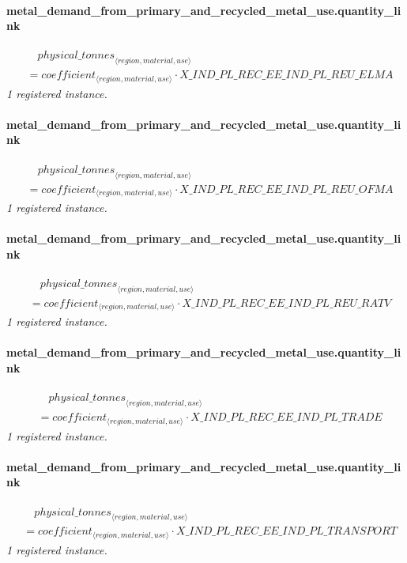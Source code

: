 \documentclass[11pt]{article}
\begin{document}
\paragraph{metal\_demand\_from\_primary\_and\_recycled\_metal\_use.quantity\_link}
\begin{align*}
&\quad {physical\_tonnes}_{\langle region, material, use\rangle}\\
&= coefficient_{\langle region, material, use\rangle} \cdot X\_IND\_PL\_REC\_EE\_IND\_PL\_REU\_ELMA
\end{align*}
\noindent\emph{1 registered instance.}\par
\paragraph{metal\_demand\_from\_primary\_and\_recycled\_metal\_use.quantity\_link}
\begin{align*}
&\quad {physical\_tonnes}_{\langle region, material, use\rangle}\\
&= coefficient_{\langle region, material, use\rangle} \cdot X\_IND\_PL\_REC\_EE\_IND\_PL\_REU\_OFMA
\end{align*}
\noindent\emph{1 registered instance.}\par
\paragraph{metal\_demand\_from\_primary\_and\_recycled\_metal\_use.quantity\_link}
\begin{align*}
&\quad {physical\_tonnes}_{\langle region, material, use\rangle}\\
&= coefficient_{\langle region, material, use\rangle} \cdot X\_IND\_PL\_REC\_EE\_IND\_PL\_REU\_RATV
\end{align*}
\noindent\emph{1 registered instance.}\par
\paragraph{metal\_demand\_from\_primary\_and\_recycled\_metal\_use.quantity\_link}
\begin{align*}
&\quad {physical\_tonnes}_{\langle region, material, use\rangle}\\
&= coefficient_{\langle region, material, use\rangle} \cdot X\_IND\_PL\_REC\_EE\_IND\_PL\_TRADE
\end{align*}
\noindent\emph{1 registered instance.}\par
\paragraph{metal\_demand\_from\_primary\_and\_recycled\_metal\_use.quantity\_link}
\begin{align*}
&\quad {physical\_tonnes}_{\langle region, material, use\rangle}\\
&= coefficient_{\langle region, material, use\rangle} \cdot X\_IND\_PL\_REC\_EE\_IND\_PL\_TRANSPORT
\end{align*}
\noindent\emph{1 registered instance.}\par
\end{document}
